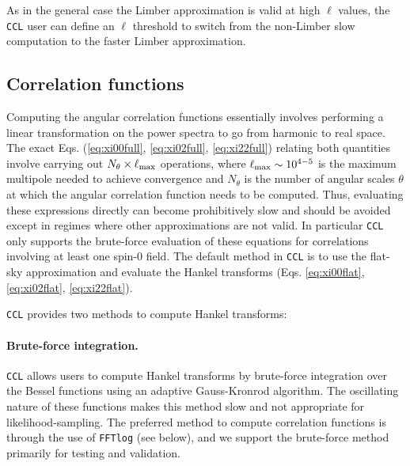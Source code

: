 \documentclass[\docopts]{\docclass}
\newcommand{\ccl}{{\tt CCL}\xspace}
\begin{document}
As in the general case the Limber approximation is valid at high $\ell$ values, the \ccl user can define an $\ell$ threshold to switch from the non-Limber slow computation to the faster Limber approximation.
 


\subsection{Correlation functions}

Computing the angular correlation functions essentially involves performing a linear transformation on the power spectra to go from harmonic to real space. The exact Eqs. (\ref{eq:xi00full}, \ref{eq:xi02full}, \ref{eq:xi22full}) relating both quantities involve carrying out $N_\theta\times\ell_{\rm max}$ operations, where $\ell_{\rm max}\sim 10^{4-5}$ is the maximum multipole needed to achieve convergence and $N_\theta$ is the number of angular scales $\theta$ at which the angular correlation function needs to be computed. Thus, evaluating these expressions directly can become prohibitively slow and should be avoided except in regimes where other approximations are not valid. In particular \ccl only supports the brute-force evaluation of these equations for correlations involving at least one spin-0 field. The default method in \ccl is to use the flat-sky approximation and evaluate the Hankel transforms (Eqs. \ref{eq:xi00flat}, \ref{eq:xi02flat}, \ref{eq:xi22flat}).

\ccl provides two methods to compute Hankel transforms:

\paragraph{\bf Brute-force integration.} \ccl allows users to compute Hankel transforms by brute-force integration over the Bessel functions using an adaptive Gauss-Kronrod algorithm. The oscillating nature of these functions makes this method slow and not appropriate for likelihood-sampling. The preferred method to compute correlation functions is through the use of {\tt FFTlog} (see below), and we support the brute-force method primarily for testing and validation.
\end{document}

